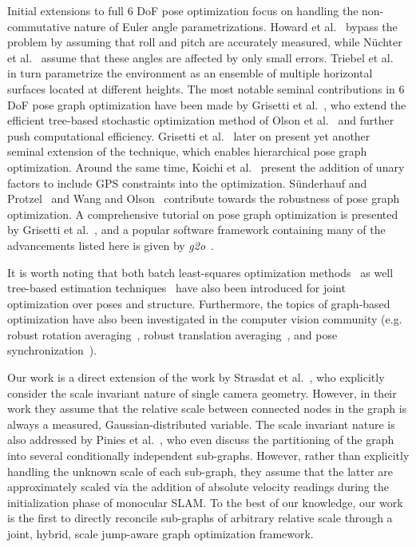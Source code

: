 \documentclass[letterpaper, 10 pt, conference]{ieeeconf}  %
\begin{document}
Initial extensions to full 6 DoF pose optimization focus on handling the non-commutative nature of Euler angle parametrizations. Howard et al.~\cite{howard04} bypass the problem by assuming that roll and pitch are accurately measured, while N\"uchter et al.~\cite{nuechter05} assume that these angles are affected by only small errors. Triebel et al.~\cite{triebel06} in turn parametrize the environment as an ensemble of multiple horizontal surfaces located at different heights. The most notable seminal contributions in 6 DoF pose graph optimization have been made by Grisetti et al.~\cite{grisetti07a,grisetti07b,grisetti09}, who extend the efficient tree-based stochastic optimization method of Olson et al.~\cite{olson06} and further push computational efficiency. Grisetti et al.~\cite{grisetti10} later on present yet another seminal extension of the technique, which enables hierarchical pose graph optimization. Around the same time, Koichi et al.~\cite{koichi10} present the addition of unary factors to include GPS constraints into the optimization. S\"underhauf and Protzel~\cite{suenderhauf12} and Wang and Olson~\cite{wang14} contribute towards the robustness of pose graph optimization. A comprehensive tutorial on pose graph optimization is presented by Grisetti et al.~\cite{grisetti10}, and a popular software framework containing many of the advancements listed here is given by \textit{g2o}~\cite{kuemmerle11}.

It is worth noting that both batch least-squares optimization methods~\cite{triggs00} as well tree-based estimation techniques~\cite{dellaert05,kaess08} have also been introduced for joint optimization over poses and structure. Furthermore, the topics of graph-based optimization have also been investigated in the computer vision community (e.g. robust rotation averaging~\cite{hartley12,govindu13,eriksson18}, robust translation averaging~\cite{wilson14}, and pose synchronization~\cite{crandall11,cui15}).

Our work is a direct extension of the work by Strasdat et al.~\cite{strasdat10}, who explicitly consider the scale invariant nature of single camera geometry. However, in their work they assume that the relative scale between connected nodes in the graph is always a measured, Gaussian-distributed variable. The scale invariant nature is also addressed by Pinies et al.~\cite{pinies08}, who even discuss the partitioning of the graph into several conditionally independent sub-graphs. However, rather than explicitly handling the unknown scale of each sub-graph, they assume that the latter are approximately scaled via the addition of absolute velocity readings during the initialization phase of monocular SLAM. To the best of our knowledge, our work is the first to directly reconcile sub-graphs of arbitrary relative scale through a joint, hybrid, scale jump-aware graph optimization framework.
\end{document}
